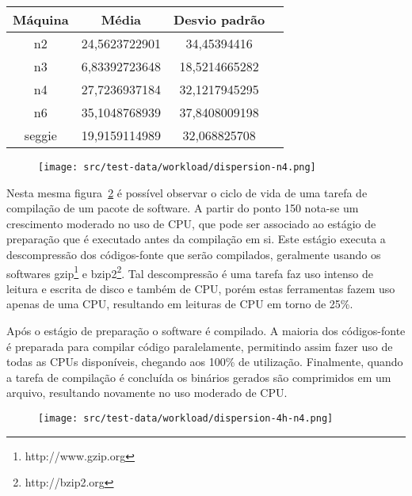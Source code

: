 \begin{table}[htp]
\centering
\hspace{-2cm} %
\label{quadro:desviopadrao}
\begin{tabular}{| c | c | c | c |}
\hline
Máquina & Média & Desvio padrão \\
\hline
n2 	& 	24,5623722901 & 34,45394416 \\
n3 	& 	6,83392723648 & 18,5214665282 \\
n4 	& 	27,7236937184 & 32,1217945295 \\
n6 	& 	35,1048768939 & 37,8408009198 \\
seggie 	&	19,9159114989 & 32,068825708 \\
\hline
\end{tabular}
\end{table}

\begin{figure}
\centering
\texttt{[image: src/test-data/workload/dispersion-n4.png]}
\label{fig:predispn4}
\end{figure}

Nesta mesma figura~\ref{fig:disp4hn4} é possível observar o ciclo de vida
de uma tarefa de compilação de um pacote de software. A partir do ponto 150
nota-se um crescimento moderado no uso de CPU, que pode ser associado ao
estágio de preparação que é executado antes da compilação em si. Este
estágio executa a descompressão dos códigos-fonte que serão compilados,
geralmente usando os softwares gzip\footnote{http://www.gzip.org} e
bzip2\footnote{http://bzip2.org}. Tal descompressão é uma tarefa faz uso
intenso de leitura e escrita de disco e também de CPU, porém estas
ferramentas fazem uso apenas de uma CPU, resultando em leituras de CPU em
torno de 25\%.

Após o estágio de preparação o software é compilado. A maioria dos
códigos-fonte é preparada para compilar código paralelamente, permitindo
assim fazer uso de todas as CPUs disponíveis, chegando aos 100\% de
utilização. Finalmente, quando a tarefa de compilação é concluída os
binários gerados são comprimidos em um arquivo, resultando novamente no uso
moderado de CPU.

\begin{figure}[htp]
\centering
\texttt{[image: src/test-data/workload/dispersion-4h-n4.png]}
\label{fig:disp4hn4}
\end{figure}

